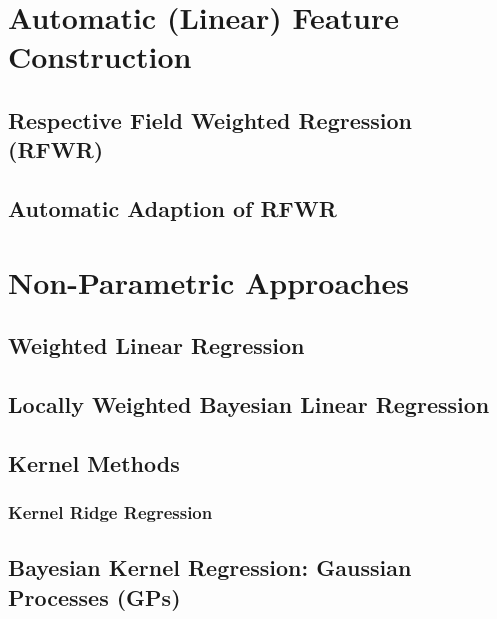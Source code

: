 	\section{Automatic (Linear) Feature Construction} %

		\subsection{Respective Field Weighted Regression (RFWR)} %

		\subsection{Automatic Adaption of RFWR} %

	\section{Non-Parametric Approaches} %

		\subsection{Weighted Linear Regression} %

		\subsection{Locally Weighted Bayesian Linear Regression} %

		\subsection{Kernel Methods} %

			\subsubsection{Kernel Ridge Regression} %

		\subsection{Bayesian Kernel Regression: Gaussian Processes (GPs)} %

